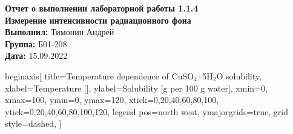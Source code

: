 \documentclass[a4paper, 12pt]{article}
\begin{document}
	\begin{Huge}
		\begin{center}
			\textbf{Отчет о выполнении лабораторной работы 1.1.4}\\
			\vspace{2em}
			\textbf{Измерение интенсивности радиационного фона}\\
			\vspace{5em}
			\textbf{Выполнил: }Тимонин Андрей\\
			\textbf{Группа: }Б01-208\\
			\vspace{10em}
			\textbf{Дата: }15.09.2022\\
		\end{center}
	\end{Huge}

begin{axis}[
title={Temperature dependence of CuSO\(_4\cdot\)5H\(_2\)O solubility},
xlabel={Temperature [\textcelsius]},
ylabel={Solubility [g per 100 g water]},
xmin=0, xmax=100,
ymin=0, ymax=120,
xtick={0,20,40,60,80,100},
ytick={0,20,40,60,80,100,120},
legend pos=north west,
ymajorgrids=true,
grid style=dashed,
]


	
	
	
	
\end{document}
